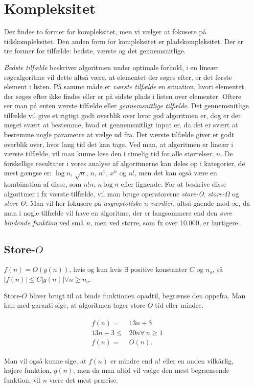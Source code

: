 \section{Kompleksitet} \label{kap:kompleksitet}

Der findes to former for kompleksitet, men vi vælger at fokusere på tidskompleksitet. Den anden form for kompleksitet er pladskompleksitet. 
Der er tre former for tilfælde: bedste, værste og det gennemsnitlige. 

\emph{Bedste tilfælde} beskriver algoritmen under optimale forhold, i en lineær søgealgoritme vil dette altså være, at elementet der søges efter, er det første element i listen. På samme måde er \emph{værste tilfælde} en situation, hvori elementet der søges efter ikke findes eller er på sidste plads i listen over elementer.
Oftere ser man på enten værste tilfælde eller \emph{gennemsnitlige tilfælde}. 
Det gennemsnitlige tilfælde vil give et rigtigt godt overblik over hvor god algoritmen er, dog er det meget svært at bestemme, hvad et gennemsnitligt input er, da det er svært at bestemme nogle parametre at vælge ud fra. 
Det værste tilfælde giver et godt overblik over, hvor lang tid det kan tage. Ved man, at algoritmen er lineær i værste tilfælde, vil man kunne løse den i rimelig tid for alle størrelser, $n$.
De forskellige resultater i vores analyse af algoritmerne kan deles op i kategorier, de mest gængse er: $\log n$, $\sqrt{n}$, $n$, $n^x$, $x^n$ og $n!$, men det kan også være en kombination af disse, som $n!n$, $n\log n$ eller lignende.
For at beskrive disse algoritmer i fx værste tilfælde, vil man bruge operatorerne \emph{store-O}, \emph{store-$\Omega$} og \emph{store-$\Theta$}. Man vil her fokusere på \emph{asymptotiske $n$-værdier}, altså gående mod $\infty$, da man i nogle tilfælde vil have en algoritme, der er langsommere end den \emph{øvre bindende funktion} ved små $n$, men ved større, som fx over 10.000, er hurtigere.

\subsection{Store-$O$}
\begin{defn}
$f(n)= O(g(n))$, hvis og kun hvis $\exists$ positive konstanter $C$ og $n_o$, så $|f(n)| \leq C |g(n)| \forall n \geq n_o$.
\end{defn}

Store-$O$ bliver brugt til at binde funktionen opadtil, begrænse den oppefra. Man kan med garanti sige, at algoritmen tager store-$O$ tid eller mindre. 
\begin{exmp}
\begin{align}
\begin{split}
f(n)=& 13n+3 \\
13n+3 \leq& 20n \forall \ n \geq 1 \\
f(n) =& O(n).
\end{split}
\end{align}
\end{exmp}
Man vil også kunne sige, at $f(n)$ er mindre end $n!$ eller en anden vilkårlig, højere funktion, $g(n)$, men da man altid vil vælge den mest begrænsende funktion, vil $n$ være det mest præcise. 

